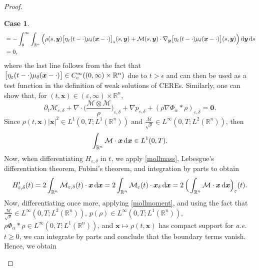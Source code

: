 \documentclass[reqno,11pt]{amsart}
\numberwithin{equation}{section}
\theoremstyle{definition}
\newtheorem{case}{Case}
\def\dd{{\, \rm d}}
\def\M{{\mathcal{M}}}
\begin{document}
\begin{proof}
\begin{case}
\begin{equation}
\begin{split}
 &= - \int^\infty_0 \int_{\mathbb{R}^n} \Big ( \rho(s,\boldsymbol{y}) \big[\eta_{\varepsilon}(t-\cdot) \mu_{\delta}(\boldsymbol{x} - \cdot)\big]_s(s,\boldsymbol{y}) + \mathcal{M}(s,\boldsymbol{y}) \cdot \nabla_{\boldsymbol{y}} \big[\eta_{\varepsilon}(t-\cdot) \mu_{\delta}(\boldsymbol{x} - \cdot)\big](s,\boldsymbol{y}) \Big ) \dd \boldsymbol{y} \dd s\\
 & = 0,
    \end{split}
\end{equation}
where the last line follows from the fact that  
$\big[\eta_{\varepsilon}(t-\cdot) \mu_{\delta}(\boldsymbol{x}- \cdot)\big] 
\in C^\infty_{\rm c}((0,\infty) \times \mathbb{R}^n)$ due to $t>\epsilon$
and can then be used as a test function in the definition of weak solutions of CEREs. 
Similarly, one can show that, for $(t,\boldsymbol{x}) \in ({\varepsilon},\infty)\times\mathbb{R}^n$,
\begin{equation}\label{mollmoment}
\partial_t \M_{{\varepsilon},{\delta}}
+ \nabla \cdot \Big(\frac{\M\otimes\M}{\rho}\Big)_{{\varepsilon},{\delta}}
+\nabla p_{{\varepsilon},{\delta}} + (\rho \nabla \Phi_\alpha * \rho)_{{\varepsilon},{\delta}} 
= \boldsymbol{0}.
\end{equation}
Since $\rho(t,\boldsymbol{x}) |\boldsymbol{x}|^2 \in L^1(0,T;L^1(\mathbb{R}^n))$ 
and $\frac{\mathcal{M}}{\sqrt{\rho}} \in L^{\infty}(0,T; L^2(\mathbb{R}^n))$, then
\[
    \int_{\mathbb{R}^n}\mathcal{M} \cdot \boldsymbol{x}\dd \boldsymbol{x} \in L^1(0,T).
\]
Now, when differentiating $H_{{\varepsilon},{\delta}}$ in $t$, 
we apply \eqref{mollmass}, Lebesgue's differentiation theorem, 
Fubini's theorem, and integration by parts to obtain
\begin{equation*}
  H_{{\varepsilon},{\delta}}'(t) = 2\int_{\mathbb{R}^n}\mathcal{M}_{{\varepsilon},{\delta}}(t) \cdot \boldsymbol{x}\dd \boldsymbol{x} = 2\int_{\mathbb{R}^n}\mathcal{M}_{\varepsilon}(t) \cdot \boldsymbol{x}_{\delta} \dd \boldsymbol{x} 
= 2\,\Big( \int_{\mathbb{R}^n}\mathcal{M} \cdot \boldsymbol{x} \dd \boldsymbol{x} \Big)_{\varepsilon}(t).
\end{equation*}
Now, differentiating once more, applying \eqref{mollmoment}, 
and using the fact that 
$\frac{\mathcal{M}}{\sqrt{\rho}} \in L^{\infty}(0,T; L^2(\mathbb{R}^n))$, 
$p(\rho) \in L^{\infty}(0,T; L^1(\mathbb{R}^n))$, 
$\rho \Phi_\alpha * \rho \in L^{\infty}(0,T; L^1(\mathbb{R}^n))$, 
and $\boldsymbol{x} \mapsto \rho(t,\boldsymbol{x})$ has compact support for {\it a.e.} $t \geq 0$,
we can integrate by parts and conclude that the boundary terms vanish. Hence, we obtain

\end{case}
\end{proof}
\end{document}
